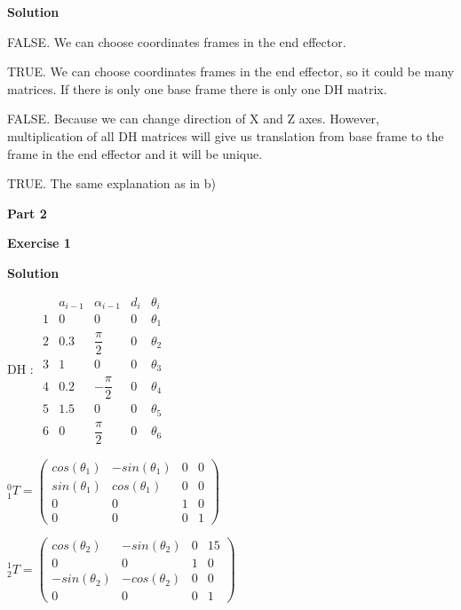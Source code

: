 \documentclass[8pt]{article}
\begin{document}
\textbf{Solution}

\medskip

\begin{list}{()~}{}
\item
FALSE. We can choose coordinates frames in the end effector.
\item
TRUE. We can choose coordinates frames in the end effector, so it could be many matrices. If there is only one base frame there is only one DH matrix.
\item
FALSE. Because we can change direction of X and Z axes. However, multiplication of all DH matrices will give us translation from base frame to the frame in the end effector and it will be unique.
\item
TRUE. The same explanation as in b)
\end{list}

\textbf{Part 2}	

\bigskip

\textbf{Exercise 1}		
		
\textbf{Solution}

\medskip

DH :
$ \begin{array}{ccccc}
& a_{i-1} & \alpha_{i-1} & d_i & \theta_i \\
1 & 0 & 0 & 0 & \theta_1 \\
2 & 0.3 & \dfrac{\pi}{2} & 0 & \theta_2 \\
3 & 1 & 0 & 0 & \theta_3 \\
4 & 0.2 & - \dfrac{\pi}{2} & 0 & \theta_4 \\
5 & 1.5 & 0 & 0 & \theta_5 \\
6 & 0 & \dfrac{\pi}{2} & 0 & \theta_6
\end{array} $

$^0_1T = \left( \begin{array}{cccc}
cos(\theta_1) & -sin(\theta_1) & 0 & 0 \\
sin(\theta_1) & cos(\theta_1) & 0 & 0 \\
0 & 0 & 1 & 0 \\
0 & 0 & 0 & 1
\end{array} \right) $

$^1_2T = \left( \begin{array}{cccc}
cos(\theta_2) & -sin(\theta_2) & 0 & 15 \\
0 & 0 & 1 & 0 \\
-sin(\theta_2) & -cos(\theta_2) & 0 & 0 \\
0 & 0 & 0 & 1
\end{array} \right) $
\end{document}
